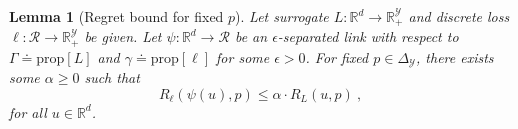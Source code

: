 \documentclass[12pt]{article}
\newcommand{\reals}{\mathbb{R}}
\newcommand{\defeq}{\doteq}%
\newcommand{\prop}[1]{\mathrm{prop}[#1]}
\newcommand{\simplex}{\Delta_\Y}
\newcommand{\R}{\mathcal{R}}
\newcommand{\Y}{\mathcal{Y}}
\newcommand{\risk}[1]{\underline{#1}}
\newcommand{\inprod}[2]{\langle #1, #2 \rangle}%
\newcommand{\regret}[3]{R_{#1}(#2,#3)}
\newtheorem{lemma}{Lemma}
\begin{document}
\begin{lemma}[Regret bound for fixed $p$]
  \label{lem:regret-bound-fixed-p}
  Let surrogate $L:\reals^d \to \reals^\Y_+$ and discrete loss $\ell:\R\to\reals^\Y_+$ be given.
  Let $\psi:\reals^d\to\R$ be an $\epsilon$-separated link with respect to $\Gamma \defeq \prop{L}$ and $\gamma \defeq \prop{\ell}$ for some $\epsilon>0$.
  For fixed $p\in\simplex$, there exists some $\alpha\geq 0$ such that
  \begin{equation}
    \label{eq:surrogate-regret-bound-fixed}
    \regret{\ell}{\psi(u)}{p}
    \leq
    \alpha \cdot \regret{L}{u}{p}~,
  \end{equation}
  for all $u\in\reals^d$.
\end{lemma}
\end{document}
